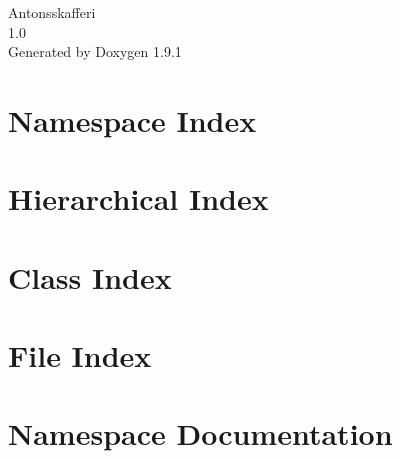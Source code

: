 \let\mypdfximage\pdfximage\def\pdfximage{\immediate\mypdfximage}\documentclass[twoside]{book}
\newcommand{\+}{\discretionary{\mbox{\scriptsize$\hookleftarrow$}}{}{}}
\newcommand{\clearemptydoublepage}{%
  \newpage{\pagestyle{empty}\cleardoublepage}%
}
\begin{document}
\raggedbottom

\hypersetup{pageanchor=false,
             bookmarksnumbered=true,
             pdfencoding=unicode
            }
\begin{titlepage}
\vspace*{7cm}
\begin{center}%
{\Large Antonsskafferi \\[1ex]\large 1.\+0 }\\
\vspace*{1cm}
{\large Generated by Doxygen 1.9.1}\\
\end{center}
\end{titlepage}
\clearemptydoublepage
{}
\tableofcontents
\clearemptydoublepage
{}
\hypersetup{pageanchor=true}

\chapter{Namespace Index}

\chapter{Hierarchical Index}

\chapter{Class Index}

\chapter{File Index}

\chapter{Namespace Documentation}






\end{document}

